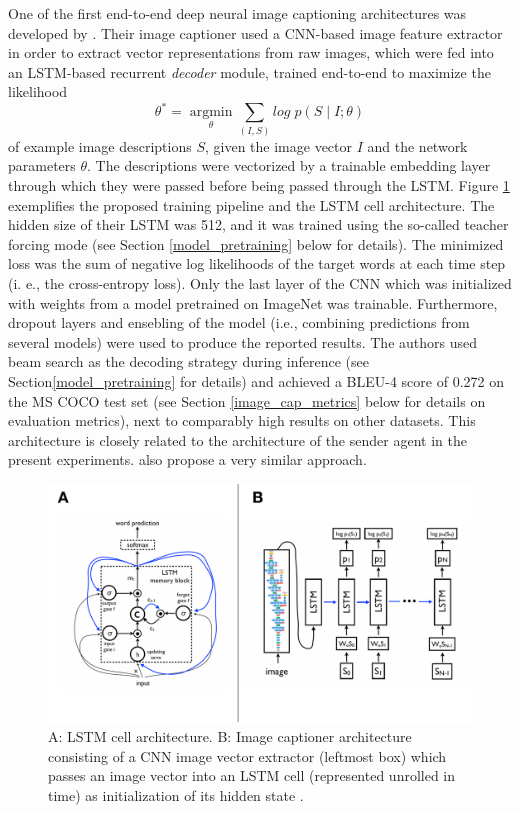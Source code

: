 One of the first end-to-end deep neural image captioning architectures was developed by \cite{vinyals2015show}. Their image captioner used a CNN-based image feature extractor in order to extract vector representations from raw images, which were fed into an LSTM-based recurrent \textit{decoder} module, trained end-to-end to maximize the likelihood 
\begin{equation}
\theta^* = \operatorname*{argmin}_\theta \sum_{(I, S)} log\; p(S \mid I; \theta) 
\end{equation}
of example image descriptions $S$, given the image vector $I$ and the network parameters $\theta$. The descriptions were vectorized by a trainable embedding layer through which they were passed before being passed through the LSTM. Figure \ref{fig:lstm} exemplifies the proposed training pipeline and the LSTM cell architecture. The hidden size of their LSTM was 512, and it was trained using the so-called teacher forcing mode (see Section \ref{model_pretraining} below for details). The minimized loss was the sum of negative log likelihoods of the target words at each time step (i. e., the cross-entropy loss). Only the last layer of the CNN which was initialized with weights from a model pretrained on ImageNet was trainable. Furthermore, dropout layers and ensebling of the model (i.e., combining predictions from several models) were used to produce the reported results. The authors used beam search as the decoding strategy during inference (see Section\ref{model_pretraining} for details) and achieved a BLEU-4 score of 0.272 on the MS COCO test set (see Section \ref{image_cap_metrics} below for details on evaluation metrics), next to comparably high results on other datasets. 
This architecture is closely related to the architecture of the sender agent in the present experiments. \cite{donahue2015long} also propose a very similar approach.

\begin{figure}
	\centering
	\includegraphics[width=\linewidth]{images/vinyals_lstm.pdf}
	\caption{A: LSTM cell architecture. B: Image captioner architecture consisting of a CNN image vector extractor (leftmost box) which passes an image vector into an LSTM cell (represented unrolled in time) as initialization of its hidden state \parencite[][p. 2--3]{vinyals2015show}.}
	\label{fig:lstm}
\end{figure}

